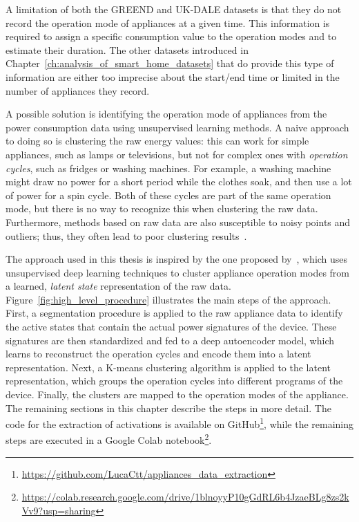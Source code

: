 A limitation of both the GREEND and UK-DALE datasets is that they do not record the operation mode of appliances at a given time. This information is required to assign a specific consumption value to the operation modes and to estimate their duration. The other datasets introduced in Chapter~\ref{ch:analysis_of_smart_home_datasets} that do provide this type of information are either too imprecise about the start/end time or limited in the number of appliances they record.

A possible solution is identifying the operation mode of appliances from the power consumption data using unsupervised learning methods. A naive approach to doing so is clustering the raw energy values: this can work for simple appliances, such as lamps or televisions, but not for complex ones with \textit{operation cycles}, such as fridges or washing machines. For example, a washing machine might draw no power for a short period while the clothes soak, and then use a lot of power for a spin cycle. Both of these cycles are part of the same operation mode, but there is no way to recognize this when clustering the raw data. Furthermore, methods based on raw data are also susceptible to noisy points and outliers; thus, they often lead to poor clustering results~\parencite{castangiaClusteringApplianceOperation2023}.

The approach used in this thesis is inspired by the one proposed by~\textcite{castangiaClusteringApplianceOperation2023}, which uses unsupervised deep learning techniques to cluster appliance operation modes from a learned, \textit{latent state} representation of the raw data. Figure~\ref{fig:high_level_procedure} illustrates the main steps of the approach. First, a segmentation procedure is applied to the raw appliance data to identify the active states that contain the actual power signatures of the device. These signatures are then standardized and fed to a deep autoencoder model, which learns to reconstruct the operation cycles and encode them into a latent representation. Next, a K-means clustering algorithm is applied to the latent representation, which groups the operation cycles into different programs of the device. Finally, the clusters are mapped to the operation modes of the appliance. The remaining sections in this chapter describe the steps in more detail. The code for the extraction of activations is available on GitHub\footnote{\url{https://github.com/LucaCtt/appliances_data_extraction}}, while the remaining steps are executed in a Google Colab notebook\footnote{\url{https://colab.research.google.com/drive/1blnoyyP10gGdRL6b4JzaeBLg8zs2kVv9?usp=sharing}}.

